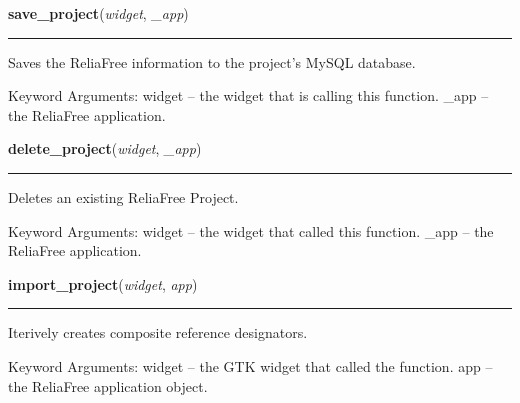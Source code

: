     \vspace{0.5ex}

\hspace{.8\funcindent}\begin{boxedminipage}{\funcwidth}

    \raggedright \textbf{save\_project}(\textit{widget}, \textit{\_app})

    \vspace{-1.5ex}

    \rule{\textwidth}{0.5\fboxrule}
\setlength{\parskip}{2ex}
    Saves the ReliaFree information to the project's MySQL database.

    Keyword Arguments: widget -- the widget that is calling this function. 
    \_app   -- the ReliaFree application.

\setlength{\parskip}{1ex}
    \end{boxedminipage}

    \label{reliafree:utilities:delete_project}

    \vspace{0.5ex}

\hspace{.8\funcindent}\begin{boxedminipage}{\funcwidth}

    \raggedright \textbf{delete\_project}(\textit{widget}, \textit{\_app})

    \vspace{-1.5ex}

    \rule{\textwidth}{0.5\fboxrule}
\setlength{\parskip}{2ex}
    Deletes an existing ReliaFree Project.

    Keyword Arguments: widget -- the widget that called this function. 
    \_app   -- the ReliaFree application.

\setlength{\parskip}{1ex}
    \end{boxedminipage}

    \label{reliafree:utilities:import_project}

    \vspace{0.5ex}

\hspace{.8\funcindent}\begin{boxedminipage}{\funcwidth}

    \raggedright \textbf{import\_project}(\textit{widget}, \textit{app})

    \vspace{-1.5ex}

    \rule{\textwidth}{0.5\fboxrule}
\setlength{\parskip}{2ex}
    Iterively creates composite reference designators.

    Keyword Arguments: widget -- the GTK widget that called the function. 
    app    -- the ReliaFree application object.

\setlength{\parskip}{1ex}
    \end{boxedminipage}

